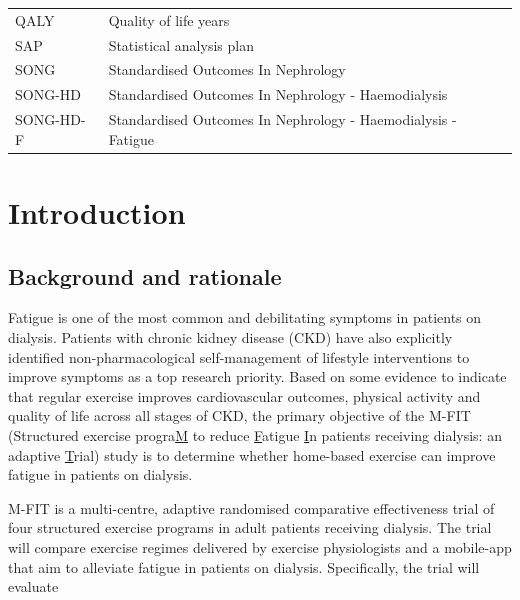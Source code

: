 \documentclass[11pt,parskip=half-]{scrartcl}
\begin{document}
\begin{table}[H]
\begin{tabular}{p{}p{}}
    QALY          & Quality of life years                                                                                            \\
    SAP           & Statistical analysis plan                                                                                        \\
    SONG          & Standardised Outcomes In Nephrology                                                                              \\
    SONG-HD       & Standardised Outcomes In Nephrology - Haemodialysis                                                              \\
    SONG-HD-F     & Standardised Outcomes In Nephrology - Haemodialysis - Fatigue                                                    \\
    \bottomrule
  \end{tabular}
\end{table}

\clearpage

\section{Introduction}
\label{Introduction}


\subsection{Background and rationale}
\label{background}

Fatigue is one of the most common and debilitating symptoms in patients on dialysis.
Patients with chronic kidney disease (CKD) have also explicitly identified non-pharmacological self-management of lifestyle interventions to improve symptoms as a top research priority.
Based on some evidence to indicate that regular exercise improves cardiovascular outcomes, physical activity and quality of life across all stages of CKD, the primary objective of the M-FIT (Structured exercise progra\underline{M} to reduce \underline{F}atigue \underline{I}n patients receiving dialysis: an adaptive \underline{T}rial) study is to determine whether home-based exercise can improve fatigue in patients on dialysis.

M-FIT is a multi-centre, adaptive randomised comparative effectiveness trial of four structured exercise programs in adult patients receiving dialysis. The trial will compare exercise regimes delivered by exercise physiologists and a mobile-app that aim to alleviate fatigue in patients on dialysis. Specifically, the trial will evaluate
\end{document}
